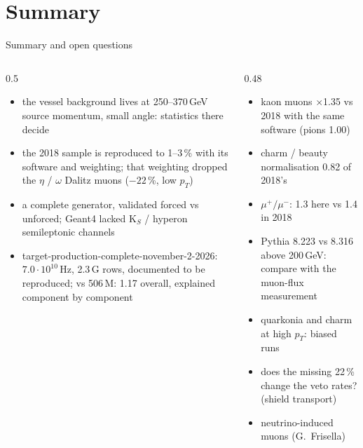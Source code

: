 \documentclass[aspectratio=169,10pt]{beamer}
\begin{document}
\section{Summary}

\begin{frame}{Summary and open questions}
  \begin{columns}[T]
    \begin{column}{0.5\textwidth}\footnotesize
      \begin{itemize}\footnotesize
        \item the vessel background lives at 250--370\,GeV source momentum, small angle: statistics there decide
        \item the 2018 sample is reproduced to 1--3\,\% with its software and weighting; that weighting dropped the $\eta$ / $\omega$ Dalitz muons ($-22$\,\%, low $p_T$)
        \item a complete generator, validated forced vs unforced; Geant4 lacked K$_S$ / hyperon semileptonic channels
        \item target-production-complete-november-2-2026: $7.0\cdot10^{10}$\,Hz, 2.3\,G rows, documented to be reproduced; vs 506\,M: 1.17 overall, explained component by component
      \end{itemize}
    \end{column}
    \begin{column}{0.48\textwidth}\footnotesize
      \begin{itemize}\footnotesize
        \item kaon muons $\times$1.35 vs 2018 with the same software (pions 1.00)
        \item charm / beauty normalisation 0.82 of 2018's
        \item $\mu^+/\mu^-$: 1.3 here vs 1.4 in 2018
        \item Pythia 8.223 vs 8.316 above 200\,GeV: compare with the muon-flux measurement
        \item quarkonia and charm at high $p_T$: biased runs
        \item does the missing 22\,\% change the veto rates? (shield transport)
        \item neutrino-induced muons (G.\ Frisella)
      \end{itemize}
    \end{column}
  \end{columns}
\end{frame}
\end{document}
